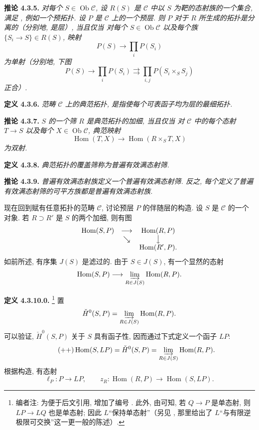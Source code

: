 \medskip
\noindent{}\textbf{推论 4.3.5.}
\textit{对每个 \(S\in\operatorname{Ob}\mathscr C\),
设 \(R(S)\) 是 \(\mathscr C\) 中以 \(S\) 为靶的态射族的一个集合,
满足 , 例如一个预拓扑.
设 \(P\) 是 \(\mathscr C\) 上的一个预层.
则 \(P\) 对于 \(R\) 所生成的拓扑是分离的（分别地, 是层）, 当且仅当
对每个 \(S\in\operatorname{Ob}\mathscr C\) 以及每个族
\(\{S_i\to S\}\in R(S)\), 映射}
\[
 P(S)\longrightarrow\prod_iP(S_i)
\]
\textit{为单射（分别地, 下图}
\[
 P(S)\longrightarrow\prod_iP(S_i)
 \rightrightarrows\prod_{i,j}P(S_i\times_SS_j)
\]
\textit{正合）.}

\medskip
\noindent{}\textbf{定义 4.3.6.}
\textit{范畴 \(\mathscr C\) 上的\emph{典范拓扑},
是指使每个可表函子均为层的最细拓扑.}

\medskip
\noindent{}\textbf{推论 4.3.7.}
\textit{\(S\) 的一个筛 \(R\) 是典范拓扑的加细, 当且仅当
对 \(\mathscr C\) 中的每个态射 \(T\to S\) 以及每个
\(X\in\operatorname{Ob}\mathscr C\), 典范映射}
\[
 \operatorname{Hom}(T,X)\longrightarrow
 \operatorname{Hom}(R\times_ST,X)
\]
\textit{为双射.}

\medskip
\noindent{}\textbf{定义 4.3.8.}
\textit{典范拓扑的覆盖筛称为\emph{普遍有效满态射筛}.}

\medskip
\noindent{}\textbf{推论 4.3.9.}
\textit{普遍有效满态射族定义一个普遍有效满态射筛.
反之, 每个定义了普遍有效满态射筛的可平方族都是普遍有效满态射族.}

现在回到赋有任意拓扑的范畴 \(\mathscr C\), 讨论预层 \(P\) 的伴随层的构造.
设 \(S\) 是 \(\mathscr C\) 的一个对象.
若 \(R\supset R'\) 是 \(S\) 的两个加细, 则有图
\[
\begin{array}{ccc}
 \operatorname{Hom}(S,P)&\longrightarrow&\operatorname{Hom}(R,P)\\
 &\searrow&\big\downarrow\\
 &&\operatorname{Hom}(R',P).
\end{array}
\]
如前所述, 有序集 \(J(S)\) 是滤过的.
由于 \(S\in J(S)\), 有一个显然的态射
\[
 \operatorname{Hom}(S,P)\longrightarrow
 \varinjlim_{R\in J(S)}\operatorname{Hom}(R,P).
\]

\medskip
\noindent{}\textbf{定义 4.3.10.0.}
\footnote{编者注: 为便于后文引用, 增加了编号
.
此外, 由可知,
若 \(Q\to P\) 是单态射, 则 \(LP\to LQ\) 也是单态射;
因此 \(L\)“保持单态射”（另见 ,
那里给出了 \(L\)“与有限逆极限可交换”这一更一般的陈述）.}
置
\[
 \check H^0(S,P)=
 \varinjlim_{R\in J(S)}\operatorname{Hom}(R,P).
\]
可以验证, \(\check H^0(S,P)\) 关于 \(S\) 具有函子性,
因而通过下式定义一个函子 \(LP\):
\[
\tag{++}\label{sga3:iv:definition:4:3:10:0:eq:unnamed:01}
 \operatorname{Hom}(S,LP)=\check H^0(S,P)
 =\varinjlim_{R\in J(S)}\operatorname{Hom}(R,P).
\]
根据构造, 有态射
\[
 \ell_P:P\longrightarrow LP,
 \qquad
 z_R:\operatorname{Hom}(R,P)\longrightarrow\operatorname{Hom}(S,LP).
\]

